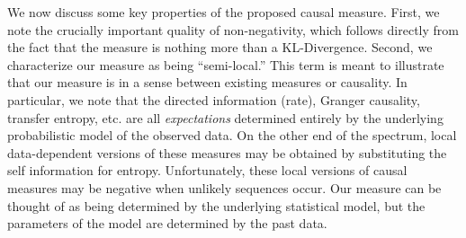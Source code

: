 We now discuss some key properties of the proposed causal measure. First, we note the crucially important quality of non-negativity, which follows directly from the fact that the measure is nothing more than a KL-Divergence. Second, we characterize our measure as being ``semi-local.'' This term is meant to illustrate that our measure is in a sense between existing measures or causality. In particular, we note that the directed information (rate), Granger causality, transfer entropy, etc. are all \emph{expectations} determined entirely by the underlying probabilistic model of the observed data. On the other end of the spectrum, local data-dependent versions of these measures may be obtained by substituting the self information for entropy. Unfortunately, these local versions of causal measures may be negative when unlikely sequences occur. Our measure can be thought of as being determined by the underlying statistical model, but the parameters of the model are determined by the past data.













\begin{comment}
\noindent This process can be equivalently characterized by the four-state ``complete'' Markov Chain with states $(X,Y) \in \{0,1\}^2$ and transition matrix:

\begin{equation}
M^{(c)} =
\begin{blockarray}{ccccc}
(0,0) & (0,1) & (1,0) & (1,1) \\
\begin{block}{(cccc)c}
    0.25 & 0.1 & 0.25 & 0.1 & (0,0) \\
    0.25 & 0.9 & 0.25 & 0.9 & (0,1) \\
    0.25 & 0.1 & 0.25 & 0.1 & (1,0) \\
    0.25 & 0.9 & 0.25 & 0.9 & (1,1) \\
\end{block}
\end{blockarray}
\end{equation}

\noindent where $M^{(c)}_{kj}$ represents the probability of having $(X_i,Y_i)$ in state $k$ given that $(X_{i-1},Y_{i-1})$ is in state $j$. We can additionally define a two-state ``restricted'' Markov Chain with states $X \in \{0,1\}$ and transition matrix:

\begin{equation}
M^{(r)} =
\begin{blockarray}{ccc}
0 & 1 \\
\begin{block}{(cc)c}
    0.3 & 0.3 & 0 \\
    0.7 & 0.7 & 1 \\
\end{block}
\end{blockarray}
\end{equation}
\end{comment}